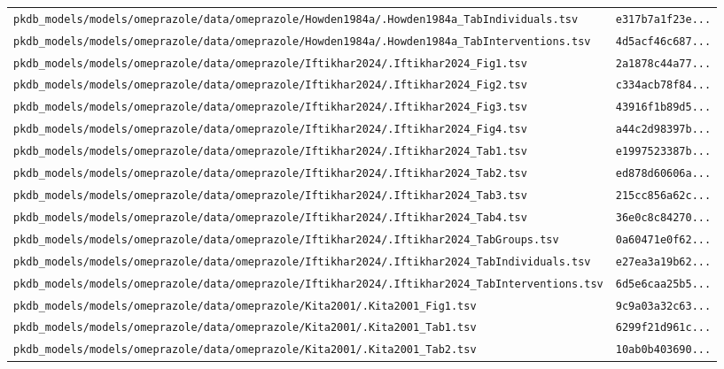 \begin{longtable}{ll}
\texttt{pkdb\_models/models/omeprazole/data/omeprazole/Howden1984a/.Howden1984a\_TabIndividuals.tsv} & \texttt{e317b7a1f23e...} \\
\texttt{pkdb\_models/models/omeprazole/data/omeprazole/Howden1984a/.Howden1984a\_TabInterventions.tsv} & \texttt{4d5acf46c687...} \\
\texttt{pkdb\_models/models/omeprazole/data/omeprazole/Iftikhar2024/.Iftikhar2024\_Fig1.tsv} & \texttt{2a1878c44a77...} \\
\texttt{pkdb\_models/models/omeprazole/data/omeprazole/Iftikhar2024/.Iftikhar2024\_Fig2.tsv} & \texttt{c334acb78f84...} \\
\texttt{pkdb\_models/models/omeprazole/data/omeprazole/Iftikhar2024/.Iftikhar2024\_Fig3.tsv} & \texttt{43916f1b89d5...} \\
\texttt{pkdb\_models/models/omeprazole/data/omeprazole/Iftikhar2024/.Iftikhar2024\_Fig4.tsv} & \texttt{a44c2d98397b...} \\
\texttt{pkdb\_models/models/omeprazole/data/omeprazole/Iftikhar2024/.Iftikhar2024\_Tab1.tsv} & \texttt{e1997523387b...} \\
\texttt{pkdb\_models/models/omeprazole/data/omeprazole/Iftikhar2024/.Iftikhar2024\_Tab2.tsv} & \texttt{ed878d60606a...} \\
\texttt{pkdb\_models/models/omeprazole/data/omeprazole/Iftikhar2024/.Iftikhar2024\_Tab3.tsv} & \texttt{215cc856a62c...} \\
\texttt{pkdb\_models/models/omeprazole/data/omeprazole/Iftikhar2024/.Iftikhar2024\_Tab4.tsv} & \texttt{36e0c8c84270...} \\
\texttt{pkdb\_models/models/omeprazole/data/omeprazole/Iftikhar2024/.Iftikhar2024\_TabGroups.tsv} & \texttt{0a60471e0f62...} \\
\texttt{pkdb\_models/models/omeprazole/data/omeprazole/Iftikhar2024/.Iftikhar2024\_TabIndividuals.tsv} & \texttt{e27ea3a19b62...} \\
\texttt{pkdb\_models/models/omeprazole/data/omeprazole/Iftikhar2024/.Iftikhar2024\_TabInterventions.tsv} & \texttt{6d5e6caa25b5...} \\
\texttt{pkdb\_models/models/omeprazole/data/omeprazole/Kita2001/.Kita2001\_Fig1.tsv} & \texttt{9c9a03a32c63...} \\
\texttt{pkdb\_models/models/omeprazole/data/omeprazole/Kita2001/.Kita2001\_Tab1.tsv} & \texttt{6299f21d961c...} \\
\texttt{pkdb\_models/models/omeprazole/data/omeprazole/Kita2001/.Kita2001\_Tab2.tsv} & \texttt{10ab0b403690...} \\

\end{longtable}
